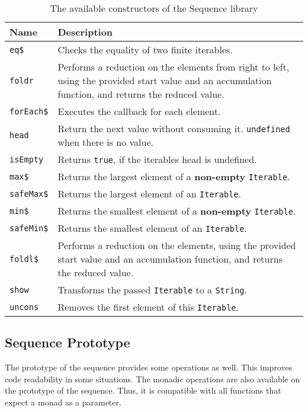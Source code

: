 \begin{table}[H]
  \centering
  \begin{tabularx}{\textwidth}{| l | X |} \hline
    \textbf{Name} & \textbf{Description} \\ \hline
    \texttt{eq\$} & Checks the equality of two finite iterables. \\ \hline 
    \texttt{foldr} & Performs a reduction on the elements from right to left, using the provided start value and an accumulation function, and returns the reduced value. \\ \hline 
    \texttt{forEach\$} & Executes the callback for each element. \\ \hline 
    \texttt{head} & Return the next value without consuming it. \texttt{undefined} when there is no value. \\ \hline 
    \texttt{isEmpty} & Returns \texttt{true}, if the iterables head is undefined. \\ \hline 
    \texttt{max\$} & Returns the largest element of a \textbf{non-empty} \texttt{Iterable}. \\ \hline 
    \texttt{safeMax\$} & Returns the largest element of an \texttt{Iterable}. \\ \hline 
    \texttt{min\$} & Returns the smallest element of a \textbf{non-empty} \texttt{Iterable}. \\ \hline 
    \texttt{safeMin\$} & Returns the smallest element of an \texttt{Iterable}. \\ \hline 
    \texttt{foldl\$} & Performs a reduction on the elements, using the provided start value and an accumulation function, and returns the reduced value. \\ \hline 
    \texttt{show} & Transforms the passed \texttt{Iterable} to a \texttt{String}. \\ \hline 
    \texttt{uncons} & Removes the first element of this \texttt{Iterable}. \\ \hline 
  \end{tabularx}
  \caption{The available constructors of the Sequence library}
  \label{tab:api_term_ops}
\end{table}

\subsection{Sequence Prototype} %
\label{sub:Sequence Prototype}
The prototype of the sequence provides some operations as well. This improves
code readability in some situations. The monadic operations are also available
on the prototype of the sequence. Thus, it is compatible with all functions
that expect a monad as a parameter.

